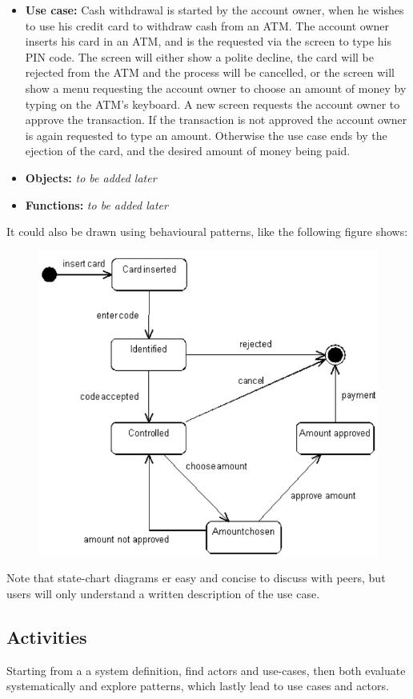 \begin{itemize}
    \item[] \textbf{Use case:} Cash withdrawal is started by the account owner, when he wishes to use his credit card to withdraw cash from an ATM. The account owner inserts his card in an ATM, and is the requested via the screen to type his PIN code. The screen will either show a polite decline, the card will be rejected from the ATM and the process will be cancelled, or the screen will show a menu requesting the account owner to choose an amount of money by typing on the ATM's keyboard. A new screen requests the account owner to approve the transaction. If the transaction is not approved the account owner is again requested to type an amount. Otherwise the use case ends by the ejection of the card, and the desired amount of money being paid.
    \item[] \textbf{Objects:} \textit{to be added later}
    \item[] \textbf{Functions:} \textit{to be added later}
\end{itemize}

It could also be drawn using behavioural patterns, like the following figure shows:

\begin{figure}[H]
    \centering
    \includegraphics[width=.7\textwidth]{figures/usecasechart.png}
\end{figure}

Note that state-chart diagrams er easy and concise to discuss with peers, but users will only understand a written description of the use case.

\subsection{Activities}
Starting from a a system definition, find actors and use-cases, then both evaluate systematically and explore patterns, which lastly lead to use cases and actors.


